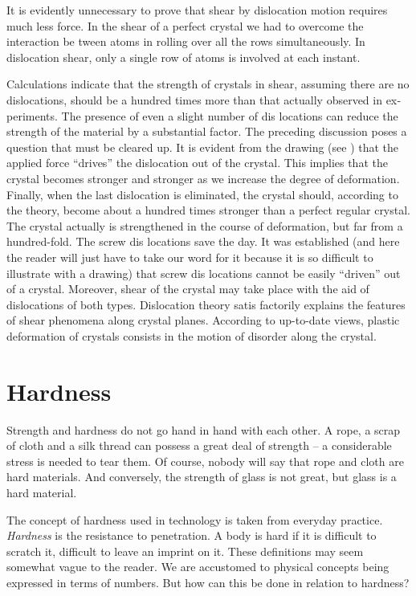It is evidently unnecessary to prove that shear by dislocation motion requires much less force. In the shear of a perfect crystal we had to overcome the interaction be­ tween atoms in rolling over all the rows simultaneously. In dislocation shear, only a single row of atoms is involved at each instant.

Calculations indicate that the strength of crystals in shear, assuming there are no dislocations, should be a hundred times more than that actually observed in ex­periments. The presence of even a slight number of dis­ locations can reduce the strength of the material by a substantial factor.
The preceding discussion poses a question that must be cleared up. It is evident from the drawing (see ) that the applied force ``drives'' the dislocation out of the crystal. This implies that the crystal becomes stronger and stronger as we increase the degree of deformation. Finally, when the last dislocation is eliminated, the crys­tal should, according to the theory, become about a hundred times stronger than a perfect regular crystal. The crystal actually is strengthened in the course of deformation, but far from a hundred-fold. The screw dis­ locations save the day. It was established (and here the reader will just have to take our word for it because it is so difficult to illustrate with a drawing) that screw dis­ locations cannot be easily ``driven'' out of a crystal. More­over, shear of the crystal may take place with the aid of dislocations of both types. Dislocation theory satis­ factorily explains the features of shear phenomena along crystal planes. According to up-to-date views, plastic deformation of crystals consists in the motion of disorder
along the crystal.

\section{Hardness}

Strength and hardness do not go hand in hand with each other. A rope, a scrap of cloth and a silk thread can possess a great deal of strength -- a considerable stress is needed to tear them. Of course, nobody will say that rope and cloth are hard materials. And conversely, the strength of glass is not great, but glass is a hard material.

The concept of hardness used in technology is taken from everyday practice. \emph{Hardness} is the resistance to pen­etration. A body is hard if it is difficult to scratch it, difficult to leave an imprint on it. These definitions may seem somewhat vague to the reader. We are accustomed to physical concepts being expressed in terms of numbers. But how can this be done in relation to hardness?

